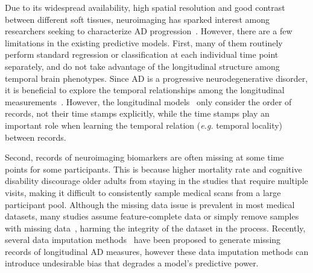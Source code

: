 Due to its widespread availability, high spatial resolution and good contrast between different soft tissues, neuroimaging has sparked interest among researchers seeking to characterize AD progression~\cite{albert2011diagnosis,stonnington2010predicting,zhang2012multi,wang2012phenotype,yan2015cortical,brand2018joint}.
However, there are a few limitations in the existing predictive models. 
First, many of them routinely perform standard regression or classification at each individual time point separately, and do not take advantage of the longitudinal structure among temporal brain phenotypes.
Since AD is a progressive neurodegenerative disorder, it is beneficial to explore the temporal relationships among the longitudinal measurements~\cite{wang2016prediction}. However, the longitudinal models~\cite{brand2018joint,wang2012high,wang2016prediction,wang2017longitudinal} only consider the order of records, not their time stamps explicitly, while the time stamps play an important role when learning the temporal relation (\emph{e.g.} temporal locality) between records.

Second, records of neuroimaging biomarkers are often missing at some time points for some participants. This is because higher mortality rate and cognitive disability discourage older adults from staying in the studies that require multiple visits, making it difficult to consistently sample medical scans from a large participant pool. Although the missing data issue is prevalent in most medical datasets, many studies assume feature-complete data or simply remove samples with missing data~\cite{stonnington2010predicting,liu2018joint}, harming the integrity of the dataset in the process. 
Recently, several data imputation methods~\cite{xiang2014bi,li2019multi} have been proposed to generate missing records of longitudinal AD measures, however these data imputation methods can introduce undesirable bias that degrades a model's predictive power.

